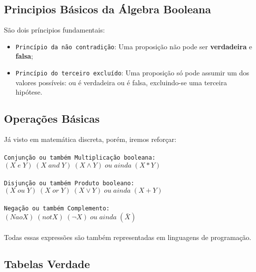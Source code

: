 \documentclass[12pt, onecolumn]{article}
\begin{document}
		\subsection{\centering Principios Básicos da Álgebra Booleana}
	
	São dois príncipios fundamentais:\\

	\begin{itemize}
		\item \texttt{Princípio da não contradição}: Uma proposição não pode 
			ser \textbf{verdadeira} e \textbf{falsa};\\
		\item \texttt{Princípio do terceiro excluído}: Uma proposição só pode
			assumir um dos valores possíveis: ou é verdadeira ou é falsa, 
			excluindo-se uma terceira hipótese.\\
	\end{itemize}


		\subsection{\centering Operações Básicas}
	
	Já visto em matemática discreta, porém, iremos reforçar:\\
	\\
	\texttt{Conjunção ou também Multiplicação booleana:}\\
	\hspace{1cm} $(X\;e\;Y) \; (X\;and\;Y)\;(X \land Y)\;ou\;ainda\;(X * Y)$\\
	\\
	\texttt{Disjunção ou também Produto booleano:}\\
	\hspace{1cm} $(X\;ou\;Y) \; (X\;or\;Y) \; (X \lor Y)\;ou\;ainda\;(X + Y)$\\
	\\
	\texttt{Negação ou também Complemento:}\\
	\hspace{1cm} $(Nao X) \; (not X) \; (\lnot X)\;ou\;ainda\;(\bar{X})$\\
	\\
	Todas essas expressões são também representadas em linguagens de 
	programação.\\
		
		\subsection{\centering Tabelas Verdade}
	
\end{document}
